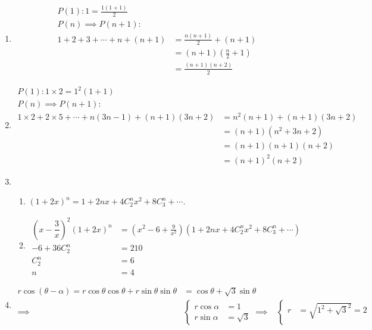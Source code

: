 \documentclass[12pt]{article}
\begin{document}
    \begin{enumerate}
        \item \begin{align*}
            P(1): 1=\frac{1(1+1)}{2}&\\
            P(n)\implies P(n+1):&\\
            1+2+3+\cdots+n+(n+1)&=\frac{n(n+1)}{2}+(n+1)\\
            &=(n+1)(\frac{n}{2}+1)\\
            &=\frac{(n+1)(n+2)}{2}
        \end{align*}
        \item \begin{align*}
            P(1): 1\times 2=1^2(1+1)\\
            P(n)\implies P(n+1):&\\
            1\times 2+2\times 5+\cdots+n(3n-1)+(n+1)(3n+2)&=n^2(n+1)+(n+1)(3n+2)\\
            &=(n+1)(n^2+3n+2)\\
            &=(n+1)(n+1)(n+2)\\
            &=(n+1)^2(n+2)
        \end{align*}
        \item \begin{enumerate}
            \item $(1+2x)^n=1+2nx+4C_2^nx^2+8C_3^n+\cdots$.
            \item \begin{align*}
                (x-\dfrac{3}{x})^2(1+2x)^n&=(x^2-6+\frac{9}{x^2})(1+2nx+4C_2^nx^2+8C_3^n+\cdots)\\
                -6+36C_2^n&=210\\
                C_2^n&=6\\
                n&=4
            \end{align*}
        \end{enumerate}
        \item \begin{align*}
            r\cos(\theta-\alpha)=r\cos{\theta}\cos{\theta}+r\sin{\theta}\sin{\theta}&=\cos{\theta}+\sqrt{3}\sin{\theta}\\
            \implies&\begin{cases}
                r\cos{\alpha}&=1\\
                r\sin{\alpha}&=\sqrt{3}
            \end{cases}
            \implies&\begin{cases}
                r&=\sqrt{1^2+\sqrt{3}^2}=2\\

\end{cases}
\end{align*}
\end{enumerate}
\end{document}
